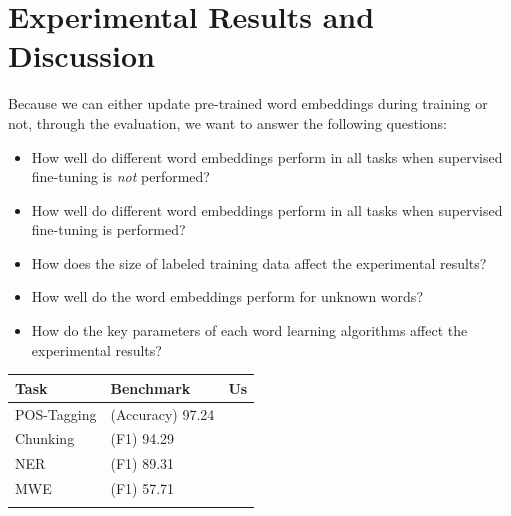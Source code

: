 

\section{Experimental Results and Discussion}

Because we can either update pre-trained word embeddings during training or not, through the evaluation, we want to answer the following questions:
\begin{itemize}
\item How well do different word embeddings perform in all tasks when supervised fine-tuning is \textit{not} performed?
\item How well do different word embeddings perform in all tasks when supervised fine-tuning is performed?
\item How does the size of labeled training data affect the experimental results?
\item How well do the word embeddings perform for unknown words? 
\item How do the key parameters of each word learning algorithms affect the experimental results?
\end{itemize}


\begin{table}
\begin{small}
\begin{tabular}{lll}
\hline
\textbf{Task} & \textbf{Benchmark} & \textbf{Us} \\ \hline
POS-Tagging & (Accuracy) 97.24 \cite{•} & \\  %
Chunking & (F1) 94.29 \cite{•} & \\  %
NER & (F1) 89.31 \cite{•} & \\  %
MWE & (F1) 57.71 \cite{•} & \\  %
\hline
\label{benchmark}
\end{tabular}
\end{small}
\end{table}



